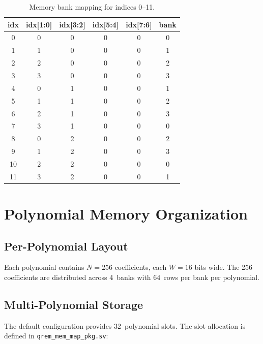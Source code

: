 \documentclass[11pt,letterpaper]{article}
\begin{document}
\begin{table}[H]
\centering
\caption{Memory bank mapping for indices 0--11.}
\label{tab:cmi_example}
\begin{tabular}{@{}cccccc@{}}
\toprule
\textbf{idx} & \textbf{idx[1:0]} & \textbf{idx[3:2]} &
\textbf{idx[5:4]} & \textbf{idx[7:6]} & \textbf{bank} \\
\midrule
0  & 0 & 0 & 0 & 0 & 0 \\
1  & 1 & 0 & 0 & 0 & 1 \\
2  & 2 & 0 & 0 & 0 & 2 \\
3  & 3 & 0 & 0 & 0 & 3 \\
4  & 0 & 1 & 0 & 0 & 1 \\
5  & 1 & 1 & 0 & 0 & 2 \\
6  & 2 & 1 & 0 & 0 & 3 \\
7  & 3 & 1 & 0 & 0 & 0 \\
8  & 0 & 2 & 0 & 0 & 2 \\
9  & 1 & 2 & 0 & 0 & 3 \\
10 & 2 & 2 & 0 & 0 & 0 \\
11 & 3 & 2 & 0 & 0 & 1 \\
\bottomrule
\end{tabular}
\end{table}

\section{Polynomial Memory Organization}
\label{sec:poly_org}

\subsection{Per-Polynomial Layout}

Each polynomial contains $N = 256$ coefficients, each $W = 16$ bits wide.
The 256 coefficients are distributed across 4~banks with 64~rows per bank
per polynomial.

\subsection{Multi-Polynomial Storage}

The default configuration provides 32~polynomial slots. The slot
allocation is defined in \texttt{qrem\_mem\_map\_pkg.sv}:
\end{document}

